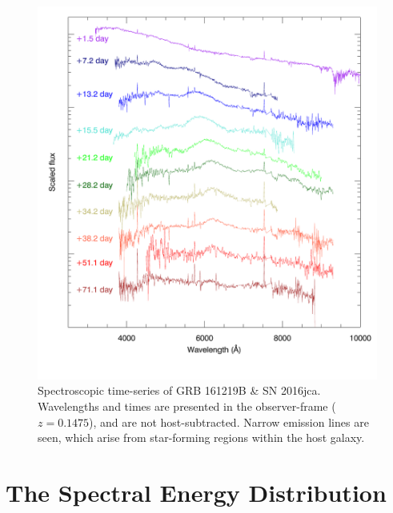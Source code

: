 \documentclass[traditabstract,longauth]{aa}
\begin{document}
\begin{figure}
   \centering
   \includegraphics[scale=0.93]{Fig6_161219B_spec-eps-converted-to.pdf}
      \caption{Spectroscopic time-series of GRB 161219B \& SN 2016jca.  Wavelengths and times are presented in the observer-frame ($z=0.1475$), and are not host-subtracted.  Narrow emission lines are seen, which arise from star-forming regions within the host galaxy.}
   \label{FigSpectra}
\end{figure}









\section{The Spectral Energy Distribution}
\label{sec:SED}
\end{document}
